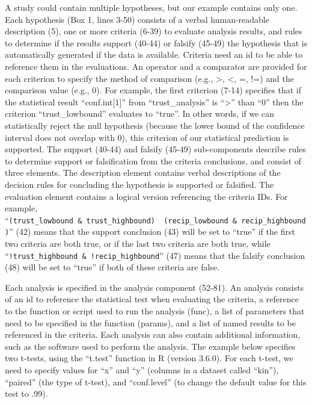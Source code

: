 \documentclass[doc,floatsintext]{apa6}
\begin{document}
A study could contain multiple hypotheses, but our example contains only one. Each hypothesis (Box 1, lines 3-50) consists of a verbal human-readable description (5), one or more criteria (6-39) to evaluate analysis results, and rules to determine if the results support (40-44) or falsify (45-49) the hypothesis that is automatically generated if the data is available. Criteria need an id to be able to reference them in the evaluations. An operator and a comparator are provided for each criterion to specify the method of comparison (e.g., \textgreater, \textless, =, !=) and the comparison value (e.g., 0). For example, the first criterion (7-14) specifies that if the statistical result \enquote{conf.int{[}1{]}} from \enquote{trust\_analysis} is \enquote{\textgreater{}} than \enquote{0} then the criterion \enquote{trust\_lowbound} evaluates to \enquote{true}. In other words, if we can statistically reject the null hypothesis (because the lower bound of the confidence interval does not overlap with 0), this criterion of our statistical prediction is supported.
The support (40-44) and falsify (45-49) sub-components describe rules to determine support or falsification from the criteria conclusions, and consist of three elements. The description element contains verbal descriptions of the decision rules for concluding the hypothesis is supported or falsified. The evaluation element contains a logical version referencing the criteria IDs. For example, \enquote{\texttt{(trust\_lowbound\ \&\ trust\_highbound)\ \textbar{}\ (recip\_lowbound\ \&\ recip\_highbound)}} (42) means that the support conclusion (43) will be set to \enquote{true} if the first two criteria are both true, or if the last two criteria are both true, while \enquote{\texttt{!trust\_highbound\ \&\ !recip\_highbound}} (47) means that the falsify conclusion (48) will be set to \enquote{true} if both of these criteria are false.

Each analysis is specified in the analysis component (52-81). An analysis consists of an id to reference the statistical test when evaluating the criteria, a reference to the function or script used to run the analysis (func), a list of parameters that need to be specified in the function (params), and a list of named results to be referenced in the criteria. Each analysis can also contain additional information, such as the software used to perform the analysis. The example below specifies two t-tests, using the \enquote{t.test} function in R (version 3.6.0). For each t-test, we need to specify values for \enquote{x} and \enquote{y} (columns in a dataset called \enquote{kin}), \enquote{paired} (the type of t-test), and \enquote{conf.level} (to change the default value for this test to .99).
\end{document}
